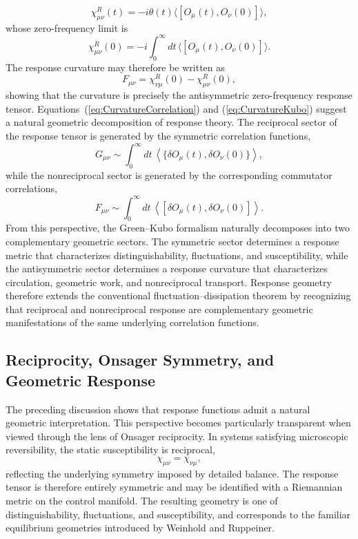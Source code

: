 %
\begin{equation}
\chi_{\mu\nu}^{R}(t)
=
-i
\theta(t)
\langle
[O_\mu(t),O_\nu(0)]
\rangle,
\end{equation}
%
whose zero-frequency limit is
%
\begin{equation}
\chi_{\mu\nu}^{R}(0)
=
-i
\int_0^\infty
dt\,
\langle
[O_\mu(t),O_\nu(0)]
\rangle.
\end{equation}
%
The response curvature may therefore be written as
%
\begin{equation}
\boxed{
F_{\mu\nu}
=
\chi_{\nu\mu}^{R}(0)
-
\chi_{\mu\nu}^{R}(0),
}
\label{eq:CurvatureKubo}
\end{equation}
%
showing that the curvature is precisely the antisymmetric
zero-frequency response tensor.
Equations~(\ref{eq:CurvatureCorrelation}) and
(\ref{eq:CurvatureKubo}) suggest a natural geometric
decomposition of response theory. The reciprocal sector of the
response tensor is generated by the symmetric correlation
functions,
%
\begin{equation}
G_{\mu\nu}
\sim
\int_0^\infty
dt\,
\left\langle
\{
\delta O_\mu(t),
\delta O_\nu(0)
\}
\right\rangle,
\end{equation}
%
while the nonreciprocal sector is generated by the corresponding
commutator correlations,
%
\begin{equation}
F_{\mu\nu}
\sim
\int_0^\infty
dt\,
\left\langle
[
\delta O_\mu(t),
\delta O_\nu(0)
]
\right\rangle.
\end{equation}
From this perspective, the Green--Kubo formalism naturally
decomposes into two complementary geometric sectors. The symmetric
sector determines a response metric that characterizes
distinguishability, fluctuations, and susceptibility, while the
antisymmetric sector determines a response curvature that
characterizes circulation, geometric work, and nonreciprocal
transport. Response geometry therefore extends the conventional
fluctuation--dissipation theorem by recognizing that reciprocal
and nonreciprocal response are complementary geometric
manifestations of the same underlying correlation functions.


\subsection{Reciprocity, Onsager Symmetry, and Geometric Response}
\label{sec:ReciprocityGeometry}
The preceding discussion shows that response functions admit a
natural geometric interpretation. This perspective becomes
particularly transparent when viewed through the lens of Onsager
reciprocity. In systems satisfying microscopic reversibility, the
static susceptibility is reciprocal,
%
\begin{equation}
\chi_{\mu\nu}
=
\chi_{\nu\mu},
\end{equation}
%
reflecting the underlying symmetry imposed by detailed balance.
The response tensor is therefore entirely symmetric and may be
identified with a Riemannian metric on the control manifold. The
resulting geometry is one of distinguishability, fluctuations,
and susceptibility, and corresponds to the familiar equilibrium
geometries introduced by Weinhold and Ruppeiner.

